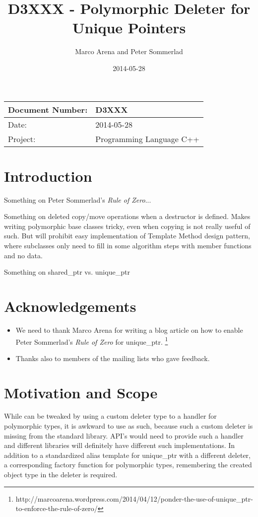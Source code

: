 \documentclass[ebook,11pt,article]{memoir}
\title{D3XXX - Polymorphic Deleter for Unique Pointers}
\author{Marco Arena and Peter Sommerlad}
\date{2014-05-28}                                           %
\begin{document}
\maketitle
\begin{tabular}[t]{|l|l|}\hline 
Document Number: & D3XXX \\\hline
Date: & 2014-05-28 \\\hline
Project: & Programming Language C++\\\hline 
\end{tabular}

\chapter{Introduction}

Something on Peter Sommerlad's \emph{Rule of Zero}...

Something on deleted copy/move operations when a destructor is defined. Makes writing polymorphic base classes tricky, even when copying is not really useful of such. But will prohibit easy implementation of Template Method design pattern, where subclasses only need to fill in some algorithm steps with member functions and no data.

Something on shared_ptr vs. unique_ptr

\chapter{Acknowledgements}
\begin{itemize}
\item We need to thank Marco Arena for writing a blog article on how to enable Peter Sommerlad's \emph{Rule of Zero} for unique_ptr. \footnote{{http://marcoarena.wordpress.com/2014/04/12/ponder-the-use-of-unique_ptr-to-enforce-the-rule-of-zero/}}
\item Thanks also to members of the mailing lists who gave feedback. 
\end{itemize}

\chapter{Motivation and Scope}

While  can be tweaked by using a custom deleter type to a handler for polymorphic types, it is awkward to use as such, because such a custom deleter is missing from the standard library. API's would need to provide such a handler and different libraries will definitely have different such implementations. In addition to a standardized alias template for unique_ptr with a different deleter, a corresponding factory function for polymorphic types, remembering the created object type in the deleter is required.
\end{document}
